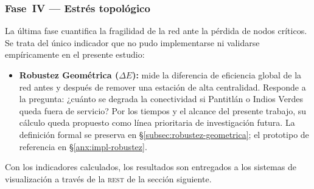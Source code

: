 \subsubsection*{Fase~IV — Estrés topológico}

La última fase cuantifica la fragilidad de la red ante la pérdida de nodos
críticos. Se trata del único indicador que no pudo implementarse ni validarse
empíricamente en el presente estudio:

\begin{itemize}
    \item \textbf{Robustez Geométrica ($\Delta E$):} mide la diferencia de
    eficiencia global de la red antes y después de remover una estación de alta
    centralidad. Responde a la pregunta: ¿cuánto se degrada la conectividad si
    Pantitlán o Indios Verdes queda fuera de servicio? Por los tiempos y el
    alcance del presente trabajo, su cálculo queda propuesto como línea
    prioritaria de investigación futura. La definición formal se preserva en
    §\ref{subsec:robustez-geometrica}; el prototipo de referencia en
    §\ref{anx:impl-robustez}.
\end{itemize}

Con los indicadores calculados, los resultados son entregados a los sistemas de
visualización a través de la \api{} \textsc{rest} de la sección siguiente.
